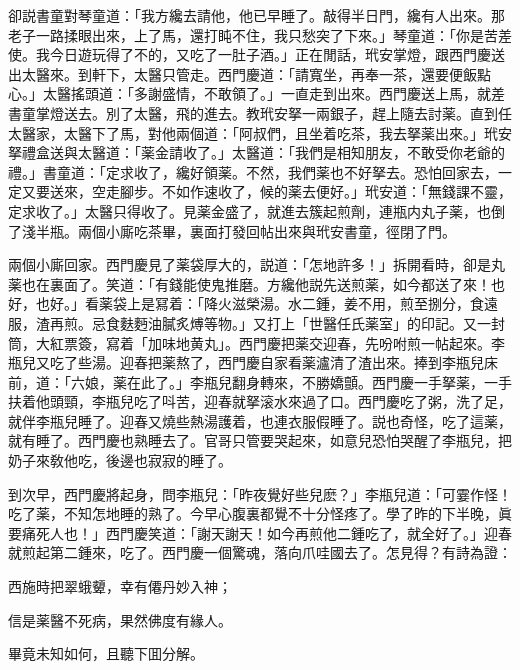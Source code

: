 卻説書童對琴童道：「我方纔去請他，他已早睡了。敲得半日門，纔有人出來。那老子一路揉眼出來，上了馬，還打盹不住，我只愁突了下來。」琴童道：「你是苦差使。我今日遊玩得了不的，又吃了一肚子酒。」正在閒話，玳安掌燈，跟西門慶送出太醫來。到軒下，太醫只管走。西門慶道：「請寬坐，再奉一茶，還要便飯點心。」太醫搖頭道：「多謝盛情，不敢領了。」一直走到出來。西門慶送上馬，就差書童掌燈送去。別了太醫，飛的進去。教玳安拏一兩銀子，趕上隨去討薬。直到任太醫家，太醫下了馬，對他兩個道：「阿叔們，且坐着吃茶，我去拏薬出來。」玳安拏禮盒送與太醫道：「薬金請收了。」太醫道：「我們是相知朋友，不敢受你老爺的禮。」書童道：「定求收了，纔好領薬。不然，我們薬也不好拏去。恐怕回家去，一定又要送來，空走腳步。不如作速收了，候的薬去便好。」玳安道：「無錢課不靈，定求收了。」太醫只得收了。見薬金盛了，就進去簇起煎劑，連瓶内丸子薬，也倒了淺半瓶。兩個小廝吃茶畢，裏面打發回帖出來與玳安書童，徑閉了門。

兩個小廝回家。西門慶見了薬袋厚大的，説道：「怎地許多！」拆開看時，卻是丸薬也在裏面了。笑道：「有錢能使鬼推磨。方纔他説先送煎薬，如今都送了來！也好，也好。」看薬袋上是冩着：「降火滋榮湯。水二鍾，姜不用，煎至捌分，食遠服，渣再煎。忌食麩麪油膩炙煿等物。」又打上「世醫任氏薬室」的印記。又一封筒，大紅票簽，寫着「加味地黄丸」。西門慶把薬交迎春，先吩咐煎一帖起來。李瓶兒又吃了些湯。迎春把薬熬了，西門慶自家看薬瀘清了渣出來。捧到李瓶兒床前，道：「六娘，薬在此了。」李瓶兒翻身轉來，不勝嬌顫。西門慶一手拏薬，一手扶着他頭頸，李瓶兒吃了呌苦，迎春就拏滚水來過了口。西門慶吃了粥，洗了足，就伴李瓶兒睡了。迎春又燒些熱湯護着，也連衣服假睡了。説也奇怪，吃了這薬，就有睡了。西門慶也熟睡去了。官哥只管要哭起來，如意兒恐怕哭醒了李瓶兒，把奶子來敎他吃，後邊也寂寂的睡了。

到次早，西門慶將起身，問李瓶兒：「昨夜覺好些兒麽？」李瓶兒道：「可霎作怪！吃了薬，不知怎地睡的熟了。今早心腹裏都覺不十分怪疼了。學了昨的下半晚，眞要痛死人也！」西門慶笑道：「謝天謝天！如今再煎他二鍾吃了，就全好了。」迎春就煎起第二鍾來，吃了。西門慶一個驚魂，落向爪哇國去了。怎見得？有詩為證：

\begin{myquote}
西施時把翠蛾顰，幸有僊丹妙入神；

信是薬醫不死病，果然佛度有緣人。
\end{myquote}

畢竟未知如何，且聽下囬分解。

